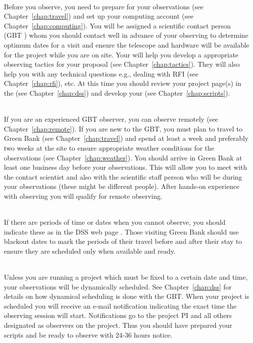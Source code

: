 \begin{description}[leftmargin=*]
\item[Step 1 - Contact your GBT \dq{friend}]\ \\
Before you observe, you need to prepare for your observations
(see Chapter~\ref{chap:travel}) and set up your computing account
(see Chapter~\ref{chap:computing}). You will be assigned a scientific
contact person (\gls{GBT} ) whom you should contact well in
advance of your observing to determine optimum dates for a visit and ensure
the telescope and hardware will be available for the project while you are
on site. Your  will help you develop a appropriate observing tactics
for your proposal (see Chapter~\ref{chap:tactics}). They will also help you
with any technical questions e.g., dealing with \gls{RFI} (see
Chapter~\ref{chap:rfi}), etc. At this time you should review your project
page(s) in the  (see Chapter~\ref{chap:dss}) and develop your
 (see Chapter~\ref{chap:scripts}).

\item [Step 2 - Make travel arrangements]\ \\
If you are an experienced \gls{GBT} observer, you can observe remotely
(see Chapter~\ref{chap:remote}). If you are new to the \gls{GBT}, you
must plan to travel to Green Bank (see Chapter~\ref{chap:travel}) and
spend at least a week and preferably two weeks at the site to ensure
appropriate weather conditions for the observations (see
Chapter~\ref{chap:weather}). You should arrive in Green Bank at least
one business day before your observations. This will allow you to meet
with the contact scientist and also with the scientific staff person who
will be  during your observations (these might be different people).
After hands-on experience with observing you will qualify for remote observing.

\item [Step 3 - Set blackout dates in the DSS]\ \\
If there are periods of time or dates when you cannot observe, you should
indicate these as  in the \gls{DSS} web page
.
Those visiting Green Bank should use blackout dates to mark the periods of
their travel before and after their stay to ensure they are scheduled only
when available and ready.

\item [Step 4 - Wait for scheduling notification]\ \\
Unless you are running a project which must be fixed to a certain date and
time, your observations will be dynamically scheduled.  See
Chapter~\ref{chap:dss} for details on how dynamical scheduling is done with
the \gls{GBT}. When your project is scheduled you will receive an e-mail
notification indicating the exact time the observing session will start.
Notifications go to the project PI and all others designated as observers
on the project.  Thus you should have prepared your scripts and be ready
to observe with 24-36 hours notice.  


\end{description}
